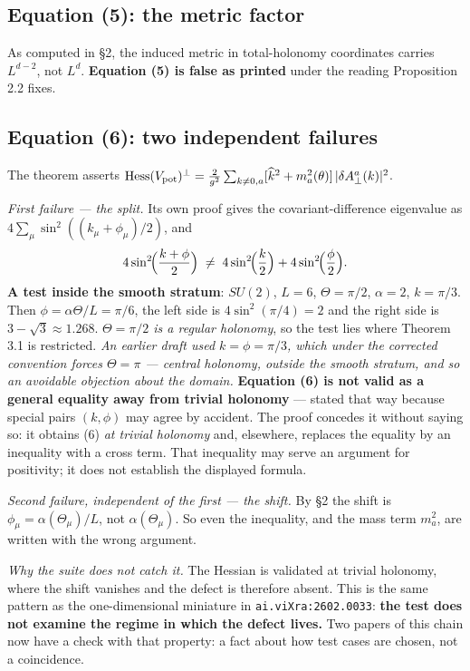 \documentclass[11pt]{article}
\begin{document}
\subsection{Equation (5): the metric factor}

As computed in \S2, the induced metric in total-holonomy coordinates carries $L^{d-2}$,
not $L^d$. \textbf{Equation (5) is false as printed} under the reading Proposition 2.2
fixes.

\subsection{Equation (6): two independent failures}

The theorem asserts
$\operatorname{Hess}(V_{\rm pot})^\perp=\frac{2}{g^2}\sum_{k\neq0,a}
[\widehat k^2+m_a^2(\theta)]\,|\delta A^a_\perp(k)|^2$.

\emph{First failure --- the split.} Its own proof gives the covariant-difference
eigenvalue as $4\sum_\mu\sin^2((k_\mu+\phi_\mu)/2)$, and
\[
4\sin^2\!\Bigl(\frac{k+\phi}{2}\Bigr)\;\neq\;
4\sin^2\!\Bigl(\frac{k}{2}\Bigr)+4\sin^2\!\Bigl(\frac{\phi}{2}\Bigr).
\]
\textbf{A test inside the smooth stratum}: $SU(2)$, $L=6$, $\Theta=\pi/2$, $\alpha=2$,
$k=\pi/3$. Then $\phi=\alpha\Theta/L=\pi/6$, the left side is $4\sin^2(\pi/4)=2$ and
the right side is $3-\sqrt3\approx1.268$. \emph{$\Theta=\pi/2$ is a regular holonomy},
so the test lies where Theorem 3.1 is restricted. \emph{An earlier draft used
$k=\phi=\pi/3$, which under the corrected convention forces $\Theta=\pi$ --- central
holonomy, outside the smooth stratum, and so an avoidable objection about the domain.}
\textbf{Equation (6) is not valid as a general equality away from trivial holonomy}
--- stated that way because special pairs $(k,\phi)$ may agree by accident. The proof
concedes it without saying so: it obtains (6) \emph{at trivial holonomy} and, elsewhere,
replaces the equality by an inequality with a cross term. That inequality may serve an
argument for positivity; it does not establish the displayed formula.

\emph{Second failure, independent of the first --- the shift.} By \S2 the shift is
$\phi_\mu=\alpha(\Theta_\mu)/L$, not $\alpha(\Theta_\mu)$. So even the inequality, and
the mass term $m_a^2$, are written with the wrong argument.

\emph{Why the suite does not catch it.} The Hessian is validated at trivial holonomy,
where the shift vanishes and the defect is therefore absent. This is the same pattern as
the one-dimensional miniature in \texttt{ai.viXra:2602.0033}: \textbf{the test does not
examine the regime in which the defect lives.} Two papers of this chain now have a check
with that property: a fact about how test cases are chosen, not a coincidence.
\end{document}
